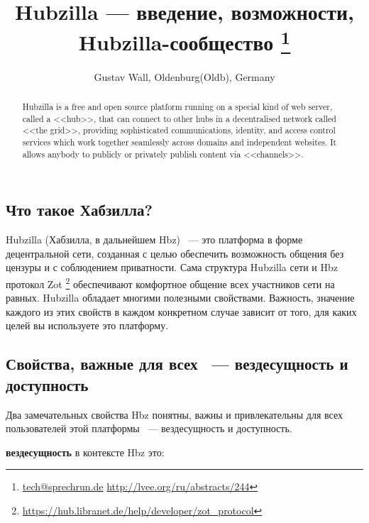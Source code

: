 \documentclass[10pt, a5paper]{article}
\begin{document}
\title{Hubzilla --- введение, возможности, Hubzilla-сообщество \footnote{\url{tech@sprechrun.de} \url{http://lvee.org/ru/abstracts/244}}}
\author{Gustav Wall, Oldenburg(Oldb), Germany}
\maketitle
\begin{abstract}
Hubzilla is a free and open source platform running on a special kind of web server, called a <<hub>>, that can connect to other hubs in a decentralised network called <<the grid>>, providing sophisticated communications, identity, and access control services which work together seamlessly across domains and independent websites. It allows anybody to publicly or privately publish content via <<channels>>.
\end{abstract}
\subsection*{Что такое Хабзилла?}

  

Hubzilla (Хабзилла, в дальнейшем Hbz) ~--- это платформа в форме децентральной сети, созданная с целью обеспечить возможность общения без цензуры и с соблюдением приватности. Сама структура Hubzilla сети и Hbz протокол Zot \footnote{\url{https://hub.libranet.de/help/developer/zot_protocol}} обеспечивают комфортное общение всех участников сети на равных. Hubzilla обладает многими полезными свойствами. Важность, значение каждого из этих свойств в каждом конкретном случае зависит от того, для каких целей вы используете это платформу.

\subsection*{Свойства, важные для всех ~--- вездесущность и доступность}

Два замечательных свойства Hbz понятны, важны и привлекательны для всех пользователей этой платформы ~--- вездесущность и доступность.

\textbf{вездесущность} в контексте Hbz это:
\end{document}
